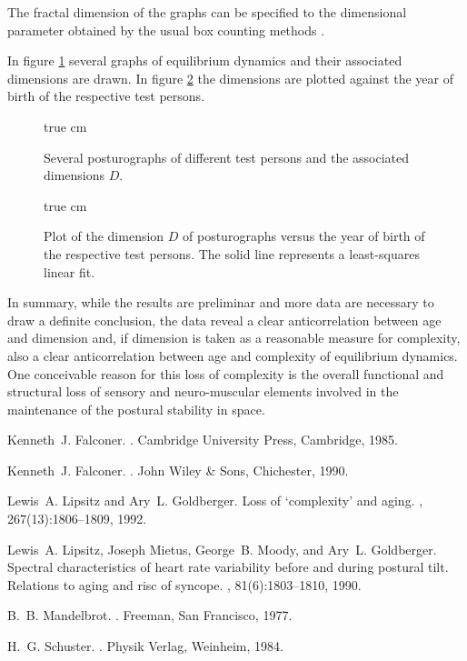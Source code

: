 The fractal dimension
of the graphs can be specified to the dimensional parameter obtained by
the usual box counting methods
\cite{mandelbrot-77,falconer1,falconer2,schuster1}.


In figure
\ref{f-cfrmg}
several graphs of equilibrium dynamics and their associated dimensions
are drawn. In figure
\ref{f-cfrmg2}
the dimensions are plotted against the year of birth of the respective
test persons.
\begin{figure}[htd]
 true cm
\caption{\label{f-cfrmg}
Several posturographs of different test persons and the
associated dimensions
$D$.}
\end{figure}
\begin{figure}[htd]
 true cm
\caption{\label{f-cfrmg2}
Plot of the dimension $D$ of  posturographs versus the
year of birth of the respective test persons. The solid line represents
a least-squares linear fit.
}
\end{figure}


In summary, while the results are preliminar and more data are necessary
to draw a definite conclusion,  the  data reveal a clear
anticorrelation between age and dimension and,
if dimension is taken as a reasonable measure for complexity, also a
clear anticorrelation between age and complexity of equilibrium
dynamics.
One conceivable reason
for this loss of complexity is the overall
functional and structural loss of sensory and neuro-muscular elements
involved in the maintenance of the postural stability in space.

%
%

\begin{thebibliography}{1}

Kenneth~J. Falconer.
.
\newblock Cambridge University Press, Cambridge, 1985.

Kenneth~J. Falconer.
.
\newblock John Wiley \& Sons, Chichester, 1990.

Lewis~A. Lipsitz and Ary~L. Goldberger.
\newblock Loss of `complexity' and aging.
, 267(13):1806--1809, 1992.

Lewis~A. Lipsitz, Joseph Mietus, George~B. Moody, and Ary~L. Goldberger.
\newblock Spectral characteristics of heart rate variability before and during
  postural tilt. {R}elations to aging and risc of syncope.
, 81(6):1803--1810, 1990.

B.~B. Mandelbrot.
.
\newblock Freeman, San Francisco, 1977.

H.~G. Schuster.
.
\newblock Physik Verlag, Weinheim, 1984.

\end{thebibliography}

